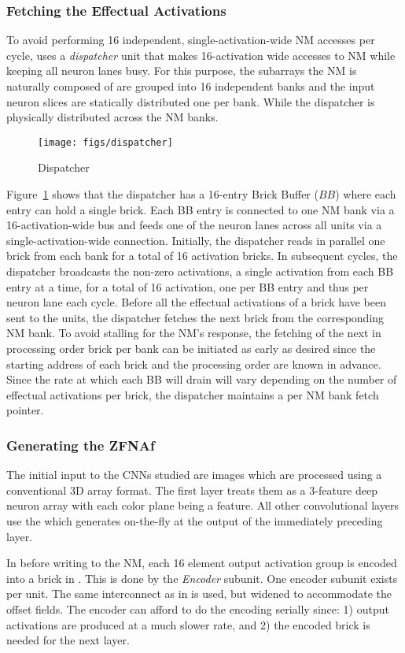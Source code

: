 \subsubsection{Fetching the Effectual Activations}

To avoid performing 16 independent, single-activation-wide NM accesses per cycle, \ZF uses a \textit{dispatcher} unit that makes 16-activation wide accesses to NM while keeping all neuron lanes busy. For this purpose, the subarrays the NM is naturally composed of are grouped into 16 independent banks and the input neuron slices are statically distributed one per bank. While the dispatcher is physically distributed across the NM banks.  


\begin{figure}[]
\centering
\texttt{[image: figs/dispatcher]}
\caption{Dispatcher~\cite{cnvlutin}}
\label{fig:dispatcher}
\end{figure}

Figure~\ref{fig:dispatcher} shows that the dispatcher has a 16-entry Brick Buffer ($BB$) where each entry can hold a single brick. Each BB entry is connected to one NM bank via a 16-activation-wide bus and feeds one of the neuron lanes across all units via a single-activation-wide connection. Initially, the dispatcher reads in parallel one brick from each bank for a total of 16 activation bricks. In subsequent cycles, the dispatcher broadcasts the non-zero activations, a single activation from each BB entry at a time, for a total of 16 activation, one per BB entry and thus per neuron lane each cycle.  
Before all the effectual activations of a brick have been sent to the units, the dispatcher fetches the next brick from the corresponding NM bank. To avoid stalling for the NM's response, the fetching of the next in processing order brick per bank can be initiated as early as desired since the starting address of each brick and the processing order are known in advance. Since the rate at which each BB will drain will vary depending on the number of effectual activations per brick, the dispatcher maintains a per NM bank fetch pointer.

\subsubsection{Generating the ZFNAf}
The initial input to the CNNs studied are images which are processed using a conventional 3D array format. The first layer treats them as a 3-feature deep neuron array with each color plane being a feature. All other convolutional layers use the \ZFNAf which \ZF generates on-the-fly at the output of the immediately preceding layer. %

In \ZF before writing to the NM, each 16 element output activation group is encoded into a brick in \ZFNAf.  This is done by the \textit{Encoder} subunit. One encoder subunit exists per \ZF unit.
The same interconnect as in \BASE is used, but widened to accommodate the offset fields.
The encoder can afford to do the encoding serially since: 1) output activations are produced at a much slower rate, and 2) the encoded brick is needed for the next layer.




